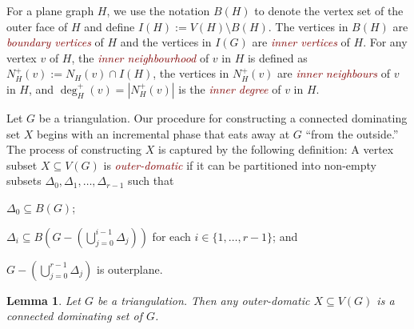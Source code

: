 \documentclass{article}
\newtheorem{lem}{Lemma}
\newcommand{\defin}[1]{\emph{\textcolor{Maroon}{#1}}}
\theoremstyle{definition}
\begin{document}
For a plane graph $H$, we use the notation $B(H)$ to denote the vertex set of the outer face of $H$ and define $I(H):=V(H)\setminus B(H)$.  The vertices in $B(H)$ are \defin{boundary vertices} of $H$ and the vertices in $I(G)$ are \defin{inner vertices} of $H$. For any vertex $v$ of $H$, the \defin{inner neighbourhood} of $v$ in $H$ is defined as $N_H^+(v):=N_H(v)\cap I(H)$, the vertices in $N^+_H(v)$ are \defin{inner neighbours} of $v$ in $H$, and $\deg^+_H(v)=|N^+_H(v)|$ is the \defin{inner degree} of $v$ in $H$.

Let $G$ be a triangulation.  Our procedure for constructing a connected dominating set $X$ begins with an incremental phase that eats away at $G$ ``from the outside.'' The process of constructing $X$ is captured by the following definition:   A vertex subset $X\subseteq V(G)$ is \defin{outer-domatic} if it can be partitioned into non-empty subsets $\Delta_0,\Delta_1,\ldots,\Delta_{r-1}$ such that
\begin{compactenum}[(P1)]
    \item $\Delta_0\subseteq B(G)$; \label{outer_face}
    \item $\Delta_i\subseteq B(G-(\bigcup_{j=0}^{i-1}\Delta_j))$ for each $i\in\{1,\ldots,r-1\}$; and \label{incremental}
    \item $G-(\bigcup_{j=0}^{r-1}\Delta_j)$ is outerplane. \label{outerplanar}
\end{compactenum}

\begin{lem}\label{outer_domatic}
    Let $G$ be a triangulation.  Then any outer-domatic $X\subseteq V(G)$ is a connected dominating set of $G$.
\end{lem}
\end{document}
